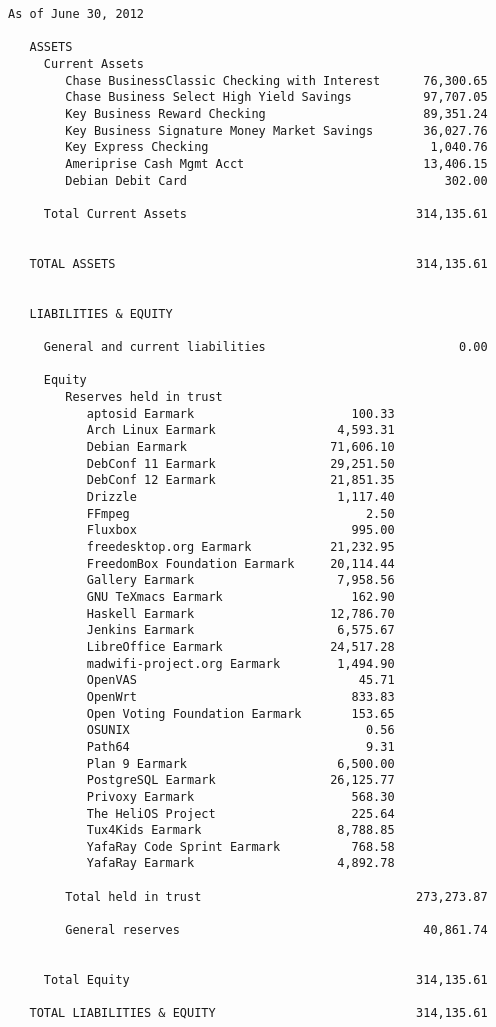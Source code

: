 \documentclass[letterpaper]{report}
\begin{document}
\begin{verbatim}
As of June 30, 2012

   ASSETS
     Current Assets
        Chase BusinessClassic Checking with Interest      76,300.65
        Chase Business Select High Yield Savings          97,707.05
        Key Business Reward Checking                      89,351.24
        Key Business Signature Money Market Savings       36,027.76
        Key Express Checking                               1,040.76
        Ameriprise Cash Mgmt Acct                         13,406.15
        Debian Debit Card                                    302.00

     Total Current Assets                                314,135.61


   TOTAL ASSETS                                          314,135.61


   LIABILITIES & EQUITY

     General and current liabilities                           0.00

     Equity
        Reserves held in trust
           aptosid Earmark                      100.33
           Arch Linux Earmark                 4,593.31
           Debian Earmark                    71,606.10
           DebConf 11 Earmark                29,251.50
           DebConf 12 Earmark                21,851.35
           Drizzle                            1,117.40
           FFmpeg                                 2.50
           Fluxbox                              995.00
           freedesktop.org Earmark           21,232.95
           FreedomBox Foundation Earmark     20,114.44
           Gallery Earmark                    7,958.56
           GNU TeXmacs Earmark                  162.90
           Haskell Earmark                   12,786.70
           Jenkins Earmark                    6,575.67
           LibreOffice Earmark               24,517.28
           madwifi-project.org Earmark        1,494.90
           OpenVAS                               45.71
           OpenWrt                              833.83
           Open Voting Foundation Earmark       153.65
           OSUNIX                                 0.56
           Path64                                 9.31
           Plan 9 Earmark                     6,500.00
           PostgreSQL Earmark                26,125.77
           Privoxy Earmark                      568.30
           The HeliOS Project                   225.64
           Tux4Kids Earmark                   8,788.85
           YafaRay Code Sprint Earmark          768.58
           YafaRay Earmark                    4,892.78

        Total held in trust                              273,273.87

        General reserves                                  40,861.74


     Total Equity                                        314,135.61

   TOTAL LIABILITIES & EQUITY                            314,135.61
\end{verbatim}
\end{document}
